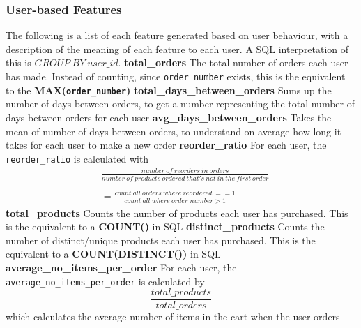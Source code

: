 \documentclass[12pt]{article}
\begin{document}
\subsubsection{User-based Features}
The following is a list of each feature generated based on user behaviour, with a description of the meaning of each feature to each user. A SQL interpretation of this is $GROUP\ BY\ user\_id$.
\newline
\newline
{\textbf{total\_orders}}
\newline
The total number of orders each user has made. Instead of counting, since \texttt{order\_number} exists, this is the equivalent to the \textbf{MAX(\texttt{order\_number})}
\newline
\newline
{\textbf{total\_days\_between\_orders}}
\newline
Sums up the number of days between orders, to get a number representing the total number of days between orders for each user
\newline
\newline
{\textbf{avg\_days\_between\_orders}}
\newline
Takes the mean of number of days between orders, to understand on average how long it takes for each user to make a new order
\newline
\newline
{\textbf{reorder\_ratio}}
\newline
For each user, the \texttt{reorder\_ratio} is calculated with
\begin{equation}
    \begin{split}
    &\frac{number\ of\ reorders\ in\ orders}{number\ of\ products\ ordered\ that's\ not\ in\ the\ first\ order} \\ \\
    &= \frac{count\ all\ orders\ where\ reordered\ == 1}{count\ all\ where\ order\_ number > 1}
    \end{split}
\end{equation}
\newline
\newline
{\textbf{total\_products}}
\newline
Counts the number of products each user has purchased. This is the equivalent to a \textbf{COUNT()} in SQL
\newline
\newline
{\textbf{distinct\_products}}
\newline
Counts the number of distinct/unique products each user has purchased. This is the equivalent to a \textbf{COUNT(DISTINCT())} in SQL
\newline
\newline
{\textbf{average\_no\_items\_per\_order}}
\newline
For each user, the \texttt{average\_no\_items\_per\_order} is calculated by
\begin{equation}
    \frac
    {total\_products}
    {total\_orders}
\end{equation}
which calculates the average number of items in the cart when the user orders
\newline
\newline
\end{document}
